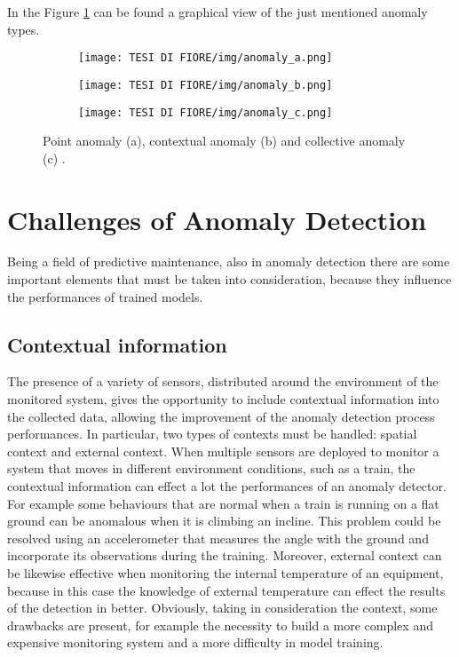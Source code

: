 In the Figure \ref{anomalies} can be found a graphical view of the just mentioned anomaly types. 
\begin{figure}[ht]
\centering
\begin{subfigure}
    \centering
    \texttt{[image: TESI DI FIORE/img/anomaly\_a.png]}
\end{subfigure}
\begin{subfigure}
    \centering
    \texttt{[image: TESI DI FIORE/img/anomaly\_b.png]}
\end{subfigure}
\begin{subfigure}
    \centering
    \texttt{[image: TESI DI FIORE/img/anomaly\_c.png]}
\end{subfigure}
\caption{Point anomaly (a), contextual anomaly (b) and collective anomaly (c) \cite{6AnomalyIoTTimeSeries}.}
\label{anomalies}
\end{figure}

\section{Challenges of Anomaly Detection}
Being a field of predictive maintenance, also in anomaly detection there are some important elements that must be taken into consideration, because they influence the performances of trained models.
\subsection{Contextual information}
The presence of a variety of sensors, distributed around the environment of the monitored system, gives the opportunity to include contextual information into the collected data, allowing the improvement of the anomaly detection process performances. In particular, two types of contexts must be handled: spatial context and external context. When multiple sensors are deployed to monitor a system that moves in different environment conditions, such as a train, the contextual information can effect a lot the performances of an anomaly detector. For example some behaviours that are normal when a train is running on a flat ground can be anomalous when it is climbing an incline. This problem could be resolved using an accelerometer that measures the angle with the ground and incorporate its observations during the training. Moreover, external context can be likewise effective when monitoring the internal temperature of an equipment, because in this case the knowledge of external temperature can effect the results of the detection in better. Obviously, taking in consideration the context, some drawbacks are present, for example the necessity to build a more complex and expensive monitoring system and a more difficulty in model training.
